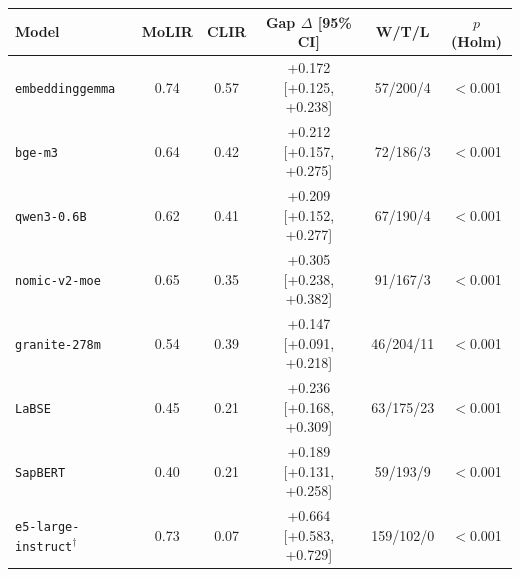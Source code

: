 \begin{tabular}{lccccc}
\toprule
Model & MoLIR & CLIR & Gap $\Delta$ [95\% CI] & W/T/L & $p$ (Holm) \\
\midrule
\texttt{embeddinggemma} & 0.74 & 0.57 & +0.172 [+0.125, +0.238] & 57/200/4 & $<$0.001 \\
\texttt{bge-m3} & 0.64 & 0.42 & +0.212 [+0.157, +0.275] & 72/186/3 & $<$0.001 \\
\texttt{qwen3-0.6B} & 0.62 & 0.41 & +0.209 [+0.152, +0.277] & 67/190/4 & $<$0.001 \\
\texttt{nomic-v2-moe} & 0.65 & 0.35 & +0.305 [+0.238, +0.382] & 91/167/3 & $<$0.001 \\
\texttt{granite-278m} & 0.54 & 0.39 & +0.147 [+0.091, +0.218] & 46/204/11 & $<$0.001 \\
\texttt{LaBSE} & 0.45 & 0.21 & +0.236 [+0.168, +0.309] & 63/175/23 & $<$0.001 \\
\texttt{SapBERT} & 0.40 & 0.21 & +0.189 [+0.131, +0.258] & 59/193/9 & $<$0.001 \\
\texttt{e5-large-instruct$^\dagger$} & 0.73 & 0.07 & +0.664 [+0.583, +0.729] & 159/102/0 & $<$0.001 \\
\bottomrule
\end{tabular}
